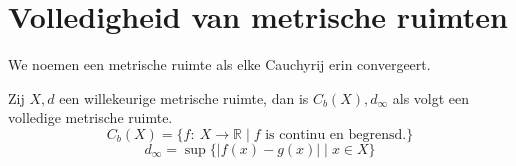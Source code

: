 \documentclass[main.tex]{subfiles}
\begin{document}
\chapter{Volledigheid van metrische ruimten}
\label{chap:volledigheid}

\begin{de}
  \label{de:volledige-metrische-ruimte}
  We noemen een metrische ruimte  als elke Cauchyrij erin convergeert.
\end{de}

\begin{bpr}
  \label{pr:begrensde-functies-van-metrische-ruimte-naar-r-volledig}
  Zij $X,d$ een willekeurige metrische ruimte, dan is $C_{b}(X),d_{\infty}$ als volgt een volledige metrische ruimte.
  \[ C_{b}(X) = \{ f:\ X \rightarrow \mathbb{R} \mid f \text{ is continu en begrensd.} \} \]
  \[ d_{\infty} = \sup\{ |f(x)-g(x)| \mid x \in X \} \]


\end{bpr}
\end{document}
